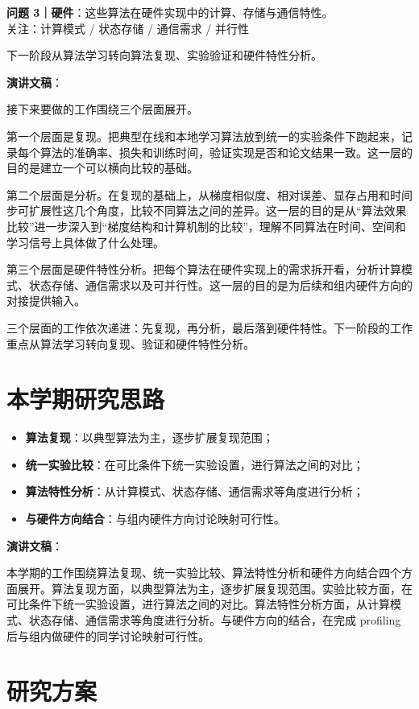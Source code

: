 \documentclass[journal,12pt,onecolumn]{IEEEtran}
\begin{document}
\textbf{问题 3｜硬件}：这些算法在硬件实现中的计算、存储与通信特性。\\
关注：计算模式 / 状态存储 / 通信需求 / 并行性

下一阶段从算法学习转向算法复现、实验验证和硬件特性分析。

\textbf{演讲文稿}：

接下来要做的工作围绕三个层面展开。

第一个层面是复现。把典型在线和本地学习算法放到统一的实验条件下跑起来，记录每个算法的准确率、损失和训练时间，验证实现是否和论文结果一致。这一层的目的是建立一个可以横向比较的基础。

第二个层面是分析。在复现的基础上，从梯度相似度、相对误差、显存占用和时间步可扩展性这几个角度，比较不同算法之间的差异。这一层的目的是从“算法效果比较”进一步深入到“梯度结构和计算机制的比较”，理解不同算法在时间、空间和学习信号上具体做了什么处理。

第三个层面是硬件特性分析。把每个算法在硬件实现上的需求拆开看，分析计算模式、状态存储、通信需求以及可并行性。这一层的目的是为后续和组内硬件方向的对接提供输入。

三个层面的工作依次递进：先复现，再分析，最后落到硬件特性。下一阶段的工作重点从算法学习转向复现、验证和硬件特性分析。

\section{本学期研究思路}

\begin{itemize}
    \item \textbf{算法复现}：以典型算法为主，逐步扩展复现范围；
    \item \textbf{统一实验比较}：在可比条件下统一实验设置，进行算法之间的对比；
    \item \textbf{算法特性分析}：从计算模式、状态存储、通信需求等角度进行分析；
    \item \textbf{与硬件方向结合}：与组内硬件方向讨论映射可行性。
\end{itemize}

\textbf{演讲文稿}：

本学期的工作围绕算法复现、统一实验比较、算法特性分析和硬件方向结合四个方面展开。算法复现方面，以典型算法为主，逐步扩展复现范围。实验比较方面，在可比条件下统一实验设置，进行算法之间的对比。算法特性分析方面，从计算模式、状态存储、通信需求等角度进行分析。与硬件方向的结合，在完成 profiling 后与组内做硬件的同学讨论映射可行性。

\section{研究方案}
\end{document}
